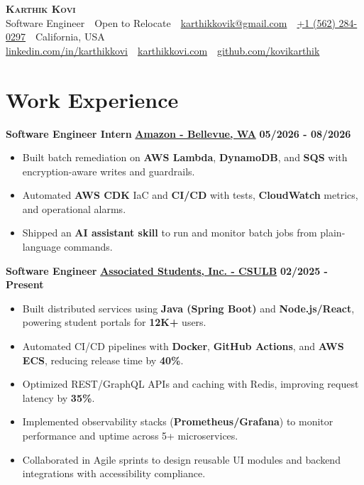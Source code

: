 \documentclass[letterpaper,11pt]{article}
\begin{document}
\begin{center}
 \textbf{\Huge \scshape Karthik Kovi}\\[-2pt]
 {Software Engineer} \,\textbar\, {Open to Relocate} \,\textbar\, \href{mailto:karthikkovik@gmail.com}{karthikkovik@gmail.com} \,\textbar\, \href{tel:+15622840297}{+1 (562) 284-0297} \,\textbar\, California, USA\\
 \href{https://www.linkedin.com/in/karthikkovi}{linkedin.com/in/karthikkovi} \,\textbar\, \href{https://karthikkovi.com}{karthikkovi.com} \,\textbar\, \href{https://github.com/kovikarthik}{github.com/kovikarthik}
\end{center}

\section{\textbf{Work Experience}}
\vspace{2pt}
\textbf{Software Engineer Intern} \hfill \uline{\textbf{Amazon - Bellevue, WA}} \hfill \hspace{0.1em} \textbf{05/2026 - 08/2026}
\begin{itemize}[itemsep=2pt, topsep=2pt, parsep=0pt, partopsep=0pt, leftmargin=10pt]
  \item Built batch remediation on \textbf{AWS Lambda}, \textbf{DynamoDB}, and \textbf{SQS} with encryption-aware writes and guardrails.
  \item Automated \textbf{AWS CDK} IaC and \textbf{CI/CD} with tests, \textbf{CloudWatch} metrics, and operational alarms.
  \item Shipped an \textbf{AI assistant skill} to run and monitor batch jobs from plain-language commands.
\end{itemize}

\textbf{Software Engineer} \hfill \uline{\textbf{Associated Students, Inc. - CSULB}} \hfill \hspace{0.1em} \textbf{02/2025 - Present}
\begin{itemize}[itemsep=2pt, topsep=2pt, parsep=0pt, partopsep=0pt, leftmargin=10pt]
  \item Built distributed services using \textbf{Java (Spring Boot)} and \textbf{Node.js/React}, powering student portals for \textbf{12K+} users.
  \item Automated CI/CD pipelines with \textbf{Docker}, \textbf{GitHub Actions}, and \textbf{AWS ECS}, reducing release time by \textbf{40\%}.
  \item Optimized REST/GraphQL APIs and caching with Redis, improving request latency by \textbf{35\%}.
  \item Implemented observability stacks (\textbf{Prometheus/Grafana}) to monitor performance and uptime across 5+ microservices.
  \item Collaborated in Agile sprints to design reusable UI modules and backend integrations with accessibility compliance.
\end{itemize}
\end{document}
